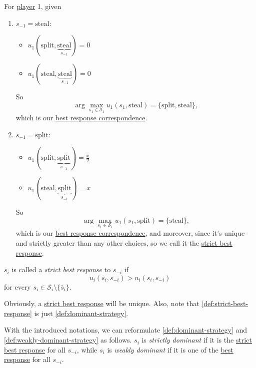 \begin{prev}
	For \hyperref[def:player]{player} 1, given
	\begin{enumerate}
		\item \(s_{-1} = \text{steal}\):
		      \begin{itemize}
			      \item \(u_1(\text{split} , \underbrace{\text{steal}}_{s_{-1}} ) = 0\)
			      \item \(u_1(\text{steal} , \underbrace{\text{steal}}_{s_{-1}} ) = 0\)
		      \end{itemize}
		      So
		      \[
			      \arg\max_{s_1\in \mathcal{S}_1} u_1(s_1, \text{steal} ) = \{\text{split}, \text{steal}  \},
		      \]
		      which is our \hyperref[def:best-response]{best response correspondence}.
		\item \(s_{-1} = \mathrm{split}\):
		      \begin{itemize}
			      \item \(u_1(\text{split} , \underbrace{\text{split}}_{s_{-1}} ) = \frac{x}{2}\)
			      \item \(u_1(\text{steal} , \underbrace{\text{split}}_{s_{-1}} ) = x\)
		      \end{itemize}
		      So
		      \[
			      \arg\max_{s_1\in \mathcal{S}_1} u_1(s_1, \text{split} ) = \{\text{steal}\},
		      \]
		      which is our \hyperref[def:best-response]{best response correspondence}, and moreover, since it's unique and strictly greater than any other choices, so we call it the \hyperref[def:strict-best-response]{strict best response}.
	\end{enumerate}
\end{prev}

\begin{definition}\label{def:strict-best-response}
	\(\overline{s}_{i}\) is called a \emph{strict best response} to \(s_{-i}\) if
	\[
		u_{i}(\overline{s}_i, s_{-i})>u_{i}(s_{i}, s_{-i})
	\]
	for every \(s_{i}\in \mathcal{S}_{i}\setminus\{\overline{s}_i\} \).
\end{definition}

\begin{note}
	Obviously, a \hyperref[def:strict-best-response]{strict best response} will be unique. Also, note that \autoref{def:strict-best-response} is just \autoref{def:dominant-strategy}.
\end{note}

\begin{remark}
	With the introduced notations, we can reformulate \autoref{def:dominant-strategy} and \autoref{def:weakly-dominant-strategy} as follows. \(s_{i}\) is \emph{strictly dominant} if it is the \hyperref[def:strict-best-response]{strict best response} for all \(s_{-i}\), while \(s_{i}\) is \emph{weakly dominant} if it is one of the \hyperref[def:best-response]{best response} for all \(s_{-i}\).
\end{remark}

